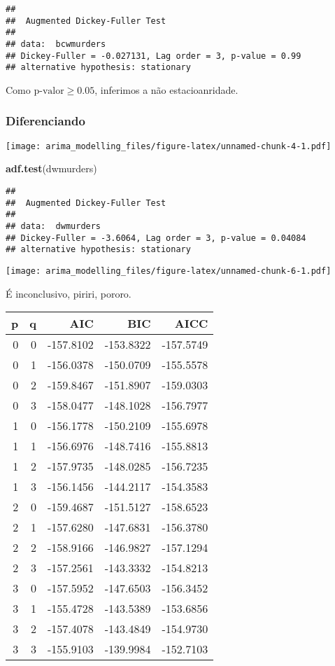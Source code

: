 \documentclass[]{article}
\newenvironment{Shaded}{\begin{snugshade}}{\end{snugshade}}
\newcommand{\KeywordTok}[1]{\textcolor[rgb]{0.13,0.29,0.53}{\textbf{#1}}}
\newcommand{\NormalTok}[1]{#1}
\begin{document}
\begin{verbatim}
## 
##  Augmented Dickey-Fuller Test
## 
## data:  bcwmurders
## Dickey-Fuller = -0.027131, Lag order = 3, p-value = 0.99
## alternative hypothesis: stationary
\end{verbatim}

Como \(\text{p-valor} \ge 0.05\), inferimos a não estacioanridade.

\hypertarget{diferenciando}{%
\subsubsection{Diferenciando}\label{diferenciando}}

\texttt{[image: arima\_modelling\_files/figure-latex/unnamed-chunk-4-1.pdf]}

\begin{Shaded}
\begin{Highlighting}[]
\KeywordTok{adf.test}\NormalTok{(dwmurders)}
\end{Highlighting}
\end{Shaded}

\begin{verbatim}
## 
##  Augmented Dickey-Fuller Test
## 
## data:  dwmurders
## Dickey-Fuller = -3.6064, Lag order = 3, p-value = 0.04084
## alternative hypothesis: stationary
\end{verbatim}

\texttt{[image: arima\_modelling\_files/figure-latex/unnamed-chunk-6-1.pdf]}

É inconclusivo, piriri, pororo.

\begin{longtable}[]{@{}rrrrr@{}}
\toprule
p & q & AIC & BIC & AICC\tabularnewline
\midrule
\endhead
0 & 0 & -157.8102 & -153.8322 & -157.5749\tabularnewline
0 & 1 & -156.0378 & -150.0709 & -155.5578\tabularnewline
0 & 2 & -159.8467 & -151.8907 & -159.0303\tabularnewline
0 & 3 & -158.0477 & -148.1028 & -156.7977\tabularnewline
1 & 0 & -156.1778 & -150.2109 & -155.6978\tabularnewline
1 & 1 & -156.6976 & -148.7416 & -155.8813\tabularnewline
1 & 2 & -157.9735 & -148.0285 & -156.7235\tabularnewline
1 & 3 & -156.1456 & -144.2117 & -154.3583\tabularnewline
2 & 0 & -159.4687 & -151.5127 & -158.6523\tabularnewline
2 & 1 & -157.6280 & -147.6831 & -156.3780\tabularnewline
2 & 2 & -158.9166 & -146.9827 & -157.1294\tabularnewline
2 & 3 & -157.2561 & -143.3332 & -154.8213\tabularnewline
3 & 0 & -157.5952 & -147.6503 & -156.3452\tabularnewline
3 & 1 & -155.4728 & -143.5389 & -153.6856\tabularnewline
3 & 2 & -157.4078 & -143.4849 & -154.9730\tabularnewline
3 & 3 & -155.9103 & -139.9984 & -152.7103\tabularnewline
\bottomrule
\end{longtable}
\end{document}
